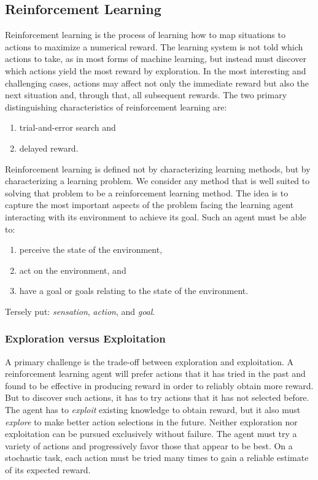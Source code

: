 \subsection{Reinforcement Learning}
Reinforcement learning \cite{SuttonBarto:1998a} is the process of learning how to map situations to actions to maximize a numerical reward.
The learning system is not told which actions to take, as in most forms of machine learning, but instead must discover which actions yield the most reward by exploration.
In the most interesting and challenging cases, actions may affect not only the immediate reward but also the next situation and, through that, all subsequent rewards.  
The two primary distinguishing characteristics of reinforcement learning are:
\begin{enumerate}
\item trial-and-error search and
\item delayed reward.
\end{enumerate}
Reinforcement learning is defined not by characterizing learning methods, but by characterizing a learning problem.
We consider any method that is well suited to solving that problem to be a reinforcement learning method.
The idea is to capture the most important aspects of the problem facing the learning agent interacting with its environment to achieve its goal.
Such an agent must be able to:
\begin{enumerate}
\item perceive the state of the environment,
\item act on the environment, and
\item have a goal or goals relating to the state of the environment.
\end{enumerate}
Tersely put: \textit{sensation}, \textit{action}, and \textit{goal}.

\subsubsection{Exploration versus Exploitation}
A primary challenge is the trade-off between exploration and exploitation.  A reinforcement learning agent will prefer actions that it has tried in the past and found to be effective in producing reward in order to reliably obtain more reward.  But to discover such actions, it has to try actions that it has not selected before.  The agent has to \textit{exploit} existing knowledge to obtain reward, but it also must \textit{explore} to make better action selections in the future.  Neither exploration nor exploitation can be pursued exclusively without failure.  The agent must try a variety of actions and progressively favor those that appear to be best.  On a stochastic task, each action must be tried many times to gain a reliable estimate of its expected reward.

